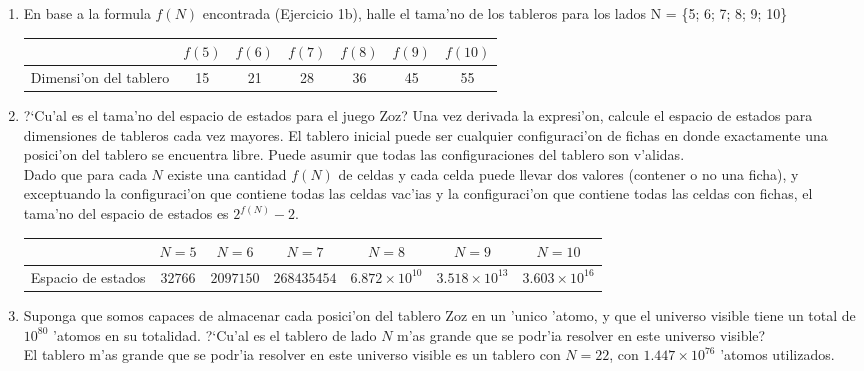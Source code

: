 \documentclass[11pt]{article}
\begin{document}
\begin{enumerate}
\begin{enumerate}
	\item En base a la formula $f(N)$ encontrada (Ejercicio 1b), halle el tama'no de los tableros para los lados N = 	\{5; 6; 7; 8; 9; 10\}
	
	\begin{center}
	\begin{tabular}{|c|c|c|c|c|c|c|}
	\hline	
	& $f(5)$ & $f(6)$ & $f(7)$ & $f(8)$ & $f(9)$ & $f(10)$ \\ 			\hline
	Dimensi'on del tablero & 15 & 21 & 28 & 36 & 45 & 55\\ 				\hline
	\end{tabular}
	\end{center} 
	
	\item ?`Cu'al es el tama'no del espacio de estados para el juego Zoz? Una vez derivada la expresi'on, calcule el espacio de estados para dimensiones de tableros cada vez mayores. El tablero inicial puede ser cualquier configuraci'on de fichas en donde exactamente una posici'on del tablero se encuentra libre. Puede asumir que todas las configuraciones del tablero son v'alidas. \\
	
	Dado que para cada $N$ existe una cantidad $f(N)$ de celdas y cada celda puede llevar dos valores (contener o no una ficha), y exceptuando la configuraci'on que contiene todas las celdas vac'ias y la configuraci'on que contiene todas las celdas con fichas, el tama'no del espacio de estados es $2^{f(N)}-2$. 	
	\begin{center}		
	\begin{tabular}{|c|c|c|c|c|c|c|}
	\hline	
	& $N=5$ & $N=6$ & $N=7$ & $N=8$ & $N=9$ & $N=10$ \\ \hline
	Espacio de estados & $32766$ & $2097150$ & $268435454$ & $6.872\times10^{10}$ & $3.518\times10^{13}$ & 					$3.603\times10^{16}$ \\ \hline
	\end{tabular}		
	\end{center} 	
	
	\item Suponga que somos capaces de almacenar cada posici'on del tablero Zoz en un 'unico 'atomo, y que el universo 	visible tiene un total de $10^{80}$ 'atomos en su totalidad. ?`Cu'al es el tablero de lado $N$ m'as grande que se podr'ia resolver en este universo visible? \\
	
	El tablero m'as grande que se podr'ia resolver en este 	universo visible es un tablero con $N=22$, con $1.447\times10^{76}$ 'atomos utilizados. \\
	

\end{enumerate}
\end{enumerate}
\end{document}
